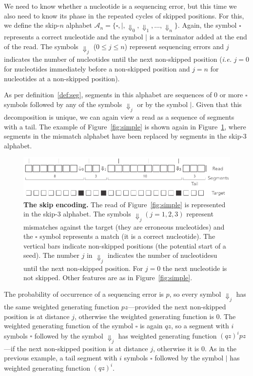 \documentclass{article}
\begin{document}
We need to know whether a nucleotide is a sequencing error, but this time
we also need to know its phase in the repeated cycles of skipped
positions. For this, we define the skip-$n$ alphabet $\mathcal{A}_n =
\{\square, |, \Downarrow_0, \Downarrow_1, \ldots, \Downarrow_n \}$. Again,
the symbol $\square$ represents a correct nucleotide and the symbol $|$ is
a terminator added at the end of the read. The symbols $\Downarrow_j$ ($ 0
\leq j \leq n$) represent sequencing errors and $j$ indicates the number
of nucleotides until the next non-skipped position (\textit{i.e.} $j=0$
for nucleotides immediately before a non-skipped position and $j=n$ for
nucleotides at a non-skipped position).

As per definition~\ref{def:seg}, segments in this alphabet are sequences
of 0 or more $\square$ symbols followed by any of the symbols
$\Downarrow_j$ or by the symbol $|$. Given that this decomposition is
unique, we can again view a read as a sequence of segments with a tail.
The example of Figure~\ref{fig:simple} is shown again in
Figure~\ref{fig:skip}, where segments in the mismatch alphabet have been
replaced by segments in the skip-3 alphabet.

\begin{figure}[h]
\centering
\includegraphics[scale=0.85]{sketch_skip.pdf}
\caption{\textbf{The skip encoding.}
The read of Figure~\ref{fig:simple} is represented in the skip-3 alphabet.
The symbols $\Downarrow_j (j = 1,2,3)$ represent mismatches against the
target (they are erroneous nucleotides) and the $\square$ symbol
represents a match (it is a correct nucleotide). The vertical bars
indicate non-skipped positions (the potential start of a seed). The number
$j$ in $\Downarrow_j$ indicates the number of nucleotidesu until the next
non-skipped position. For $j=0$ the next nucleotide is not skipped.
Other features are as in Figure~\ref{fig:simple}.}
\label{fig:skip}
\end{figure}

The probability of occurrence of a sequencing error is $p$, so every
symbol $\Downarrow_j$ has the same weighted generating function
$pz$---provided the next non-skipped position is at distance $j$,
otherwise the weighted generating function is 0. The weighted generating
function of the symbol $\square$ is again $qz$, so a segment with $i$
symbols $\square$ followed by the symbol $\Downarrow_j$ has weighted
generating function $(qz)^ipz$---if the next non-skipped position is at
distance $j$, otherwise it is 0. As in the previous example, a tail
segment with $i$ symbols $\square$ followed by the symbol $|$ has weighted
generating function $(qz)^i$.
\end{document}

